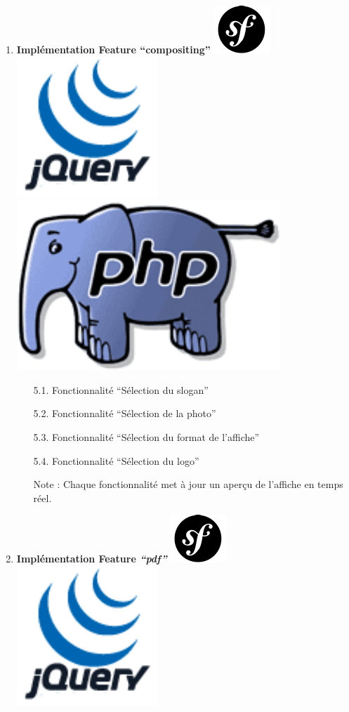 \documentclass{article}
\begin{document}
\begin{sffamily}
\begin{enumerate}
\item \textbf{Implémentation Feature \textbf{``compositing''}} \includegraphics[scale=0.5]{symfony.pdf}\includegraphics[scale=0.2]{jquery.pdf}\includegraphics[scale=0.15]{php.pdf}
	\begin{enumerate}
		\item[5.1.] Fonctionnalité ``Sélection du slogan''
		\item[5.2.] Fonctionnalité ``Sélection de la photo''
		\item[5.3.] Fonctionnalité ``Sélection du format de l'affiche''
		\item[5.4.] Fonctionnalité ``Sélection du logo''
		\item[] Note : Chaque fonctionnalité met à jour un aperçu de l'affiche en temps réel.
	\end{enumerate}
\item \textbf{Implémentation Feature \textit{``pdf''}} \includegraphics[scale=0.5]{symfony.pdf}\includegraphics[scale=0.2]{jquery.pdf}

\end{enumerate}
\end{sffamily}
\end{document}
